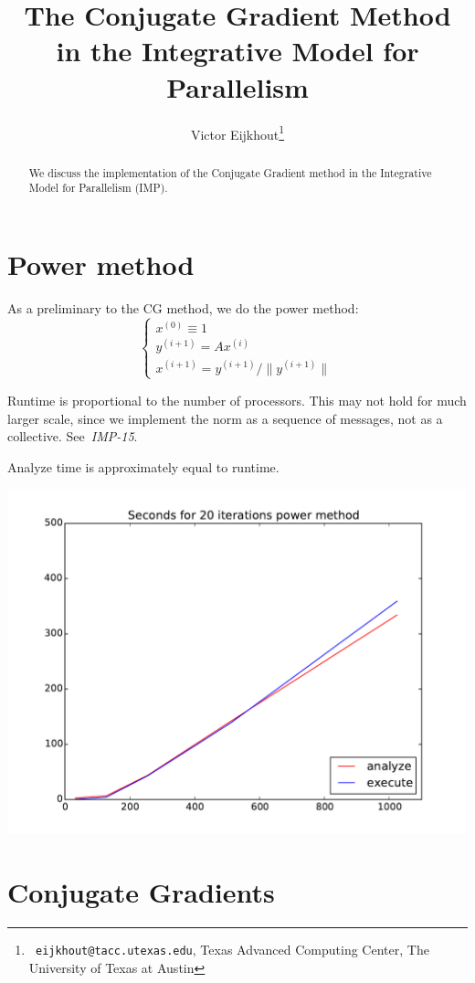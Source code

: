 \documentclass[11pt,fleqn,preprint]{impreport}
\title[IMP CG]{The Conjugate Gradient Method in the Integrative Model for Parallelism}
\author[Eijkhout]{Victor Eijkhout\thanks{{\tt
      eijkhout@tacc.utexas.edu}, Texas Advanced Computing Center, The
    University of Texas at Austin}}
\begin{document}
\maketitle

\begin{abstract}
  We discuss the implementation of the Conjugate Gradient method
  in the Integrative Model for Parallelism (IMP).
\end{abstract}

\acresetall

\section{Power method}

As a preliminary to the \ac{CG} method, we do the power method:
\[
\begin{cases}
  x^{(0)}\equiv 1\\
  y^{(i+1)} = Ax^{(i)}\\
  x^{(i+1)} = y^{(i+1)}/\|y^{(i+1)}\|
\end{cases}
\]


Runtime is proportional to the number of processors. This may not hold for much larger scale, since
we implement the norm as a sequence of messages, not as a collective. See~\emph{IMP-15}.

Analyze time is approximately equal
to runtime.

\includegraphics[scale=.5]{power_mpi_scaling}

\section{Conjugate Gradients}
\end{document}
